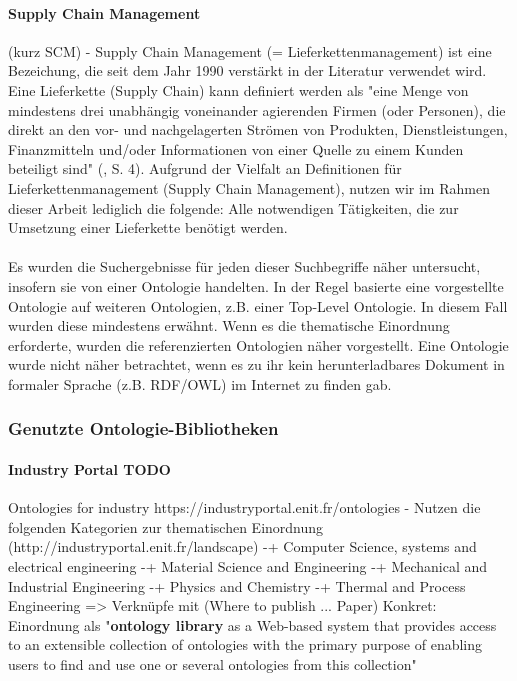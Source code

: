 \documentclass{article}
\begin{document}
\paragraph{Supply Chain Management} (kurz SCM) - Supply Chain Management (= Lieferkettenmanagement) ist eine Bezeichung, die seit dem Jahr 1990 verstärkt in der Literatur verwendet wird. Eine Lieferkette (Supply Chain) kann definiert werden als "eine Menge von mindestens drei unabhängig voneinander agierenden Firmen (oder Personen), die direkt an den vor- und nachgelagerten Strömen von Produkten, Dienstleistungen, Finanzmitteln und/oder Informationen von einer Quelle zu einem Kunden beteiligt sind" (\cite{mentzer2001defining}, S. 4). Aufgrund der Vielfalt an Definitionen für Lieferkettenmanagement (Supply Chain Management), nutzen wir im Rahmen dieser Arbeit lediglich die folgende: Alle notwendigen Tätigkeiten, die zur Umsetzung einer Lieferkette benötigt werden.

\paragraph{} Es wurden die Suchergebnisse für jeden dieser Suchbegriffe näher untersucht, insofern sie von einer Ontologie handelten.
In der Regel basierte eine vorgestellte Ontologie auf weiteren Ontologien, z.B. einer Top-Level Ontologie.
In diesem Fall wurden diese mindestens erwähnt.
Wenn es die thematische Einordnung erforderte, wurden die referenzierten Ontologien näher vorgestellt.
Eine Ontologie wurde nicht näher betrachtet, wenn es zu ihr kein herunterladbares Dokument in formaler Sprache (z.B. RDF/OWL) im Internet zu finden gab.

\subsubsection{Genutzte Ontologie-Bibliotheken}

\paragraph{Industry Portal TODO} Ontologies for industry https://industryportal.enit.fr/ontologies
- Nutzen die folgenden Kategorien zur thematischen Einordnung (http://industryportal.enit.fr/landscape)
-+ Computer Science, systems and electrical engineering
-+ Material Science and Engineering
-+ Mechanical and Industrial Engineering
-+ Physics and Chemistry
-+ Thermal and Process Engineering
=> Verknüpfe mit (Where to publish ... Paper) \cite{d2012publish}
Konkret: Einordnung als "\textbf{ontology library} as a Web-based system that provides access to an
extensible collection of ontologies with the primary purpose of enabling users to find and
use one or several ontologies from this collection"
\end{document}
